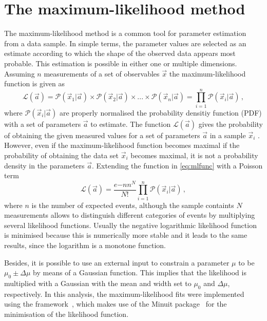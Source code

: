 \section{The maximum-likelihood method}
\label{sec:MLFit}

The maximum-likelihood method is a common tool for parameter estimation from a data sample.
In simple terms, the parameter values are selected as an estimate according to which the shape of the observed data appears most probable.
This estimation is possible in either one or multiple dimensions.
Assuming $n$ measurements of a set of observables $\vec{x}$ the maximum-likelihood function is given as
\begin{equation}
\mathcal{L}(\vec{a})=\mathcal{P}(\vec{x}_1|\vec{a})\times\mathcal{P}(\vec{x}_2|\vec{a})\times...\times\mathcal{P}(\vec{x}_n|\vec{a})=\prod_{i=1}^{n}\mathcal{P}(\vec{x}_i|\vec{a})\,,\label{eq:mlfunc}
\end{equation}
where $\mathcal{P}(\vec{x}_i|\vec{a})$ are properly normalised the probability densitiy function (PDF) with a set of parameters $\vec{a}$ to estimate.
The function $\mathcal{L}(\vec{a})$ gives the probability of obtaining the given measured values for a set of parameters $\vec{a}$ in a sample $\vec{x}_i$ .
However, even if the maximum-likelihood function becomes maximal if the probability of obtaining the data set $\vec{x}_i$ becomes maximal, it is not a probability density in the parameters $\vec{a}$.
Extending the function in \cref{eq:mlfunc} with a Poisson term
\begin{equation}
\mathcal{L}(\vec{a})=\frac{e{-n}n^N}{N!}\prod_{i=1}^{n}\mathcal{P}(\vec{x}_i|\vec{a})\,,
\end{equation}
where $n$ is the number of expected events, although the sample containts $N$ measurements allows to distinguish different categories of events by multiplying several likelihood functions.
Usually the negative logarithmic likelihood function is minimised because this is numerically more stable and it leads to the same results, since the logarithm is a monotone function.

Besides, it is possible to use an external input to constrain a parameter $\mu$ to be $\mu_0\pm\Delta\mu$ by means of a Gaussian function.
This implies that the likelihood is multiplied with a Gaussian with the mean and width set to $\mu_0$ and $\Delta\mu$, respectively.
In this analysis, the maximum-likelihood fits were implemented using the \root framework~\cite{Antcheva:2009zz}, which makes use of the Minuit package~\cite{James:1975dr} for the minimisation of the likelihood function.


